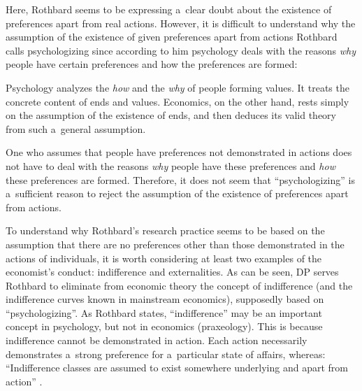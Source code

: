 Here, Rothbard seems to be expressing a~clear doubt about the existence of preferences apart from real actions. However, it is difficult to understand why the assumption of the existence of given preferences apart from actions Rothbard calls psychologizing since according to him psychology deals with the reasons \textit{why} people have certain preferences and how the preferences are formed:



Psychology analyzes the \textit{how} and the \textit{why} of people forming values. It treats the concrete content of ends and values. Economics, on the other hand, rests simply on the assumption of the existence of ends, and then deduces its valid theory from such a~general assumption. 
\parencite[][pp.296–297]{rothbard_present_2011}%




One who assumes that people have preferences not demonstrated in actions does not have to deal with the reasons \textit{why} people have these preferences and \textit{how} these preferences are formed. Therefore, it does not seem that ``psychologizing'' is a~sufficient reason to reject the assumption of the existence of preferences apart from actions.



To understand why Rothbard's research practice seems to be based on the assumption that there are no preferences other than those demonstrated in the actions of individuals, it is worth considering at least two examples of the economist's conduct: indifference and externalities. As can be seen, DP serves Rothbard to eliminate from economic theory the concept of indifference (and the indifference curves known in mainstream economics), supposedly based on ``psychologizing''. As Rothbard states, ``indifference'' may be an important concept in psychology, but not in economics (praxeology). This is because indifference cannot be demonstrated in action. Each action necessarily demonstrates a~strong preference for a~particular state of affairs, whereas: ``Indifference classes are assumed to exist somewhere underlying and apart from action'' 
\parencite[][pp.304–305]{rothbard_present_2011}.%




